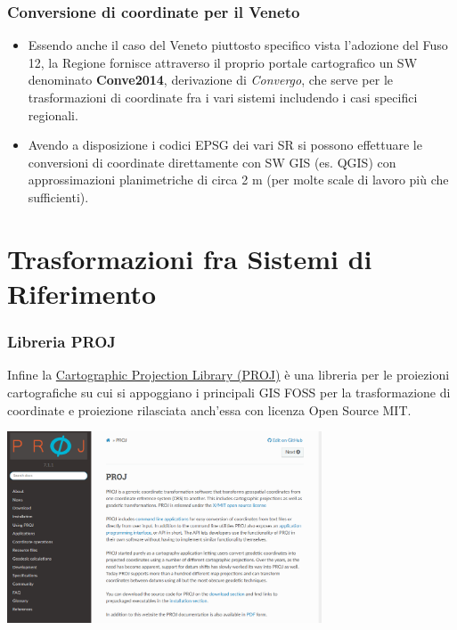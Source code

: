\documentclass{beamer}
\begin{document}
{\begin{frame}
	\frametitle{Conversione di coordinate per il Veneto}
	\begin{itemize}  
		\item Essendo anche il caso del Veneto piuttosto specifico vista l'adozione del Fuso 12, la Regione fornisce attraverso il proprio portale cartografico un SW denominato \textbf{Conve2014}, derivazione di \textit{Convergo}, che serve per le trasformazioni di coordinate fra i vari sistemi includendo i casi specifici regionali.  
		\item Avendo a disposizione i codici EPSG dei vari SR si possono effettuare le conversioni di coordinate direttamente con SW GIS (es. QGIS) con approssimazioni planimetriche di circa 2 m (per molte scale di lavoro più che sufficienti). 
	\end{itemize}   	
\end{frame}

\section{Trasformazioni fra Sistemi di Riferimento}

\begin{frame}
	\frametitle{Libreria PROJ}
	\footnotesize
	Infine la \href{https://proj.org/}{Cartographic Projection Library (PROJ)}
    è una libreria per le proiezioni cartografiche su cui si appoggiano i principali GIS FOSS per la trasformazione di coordinate e proiezione rilasciata anch'essa con licenza Open Source MIT.
	\begin{center}
		\includegraphics[width=0.7\textwidth]{pics/proj.PNG}
	\end{center}
	
\end{frame}

}
\end{document}
